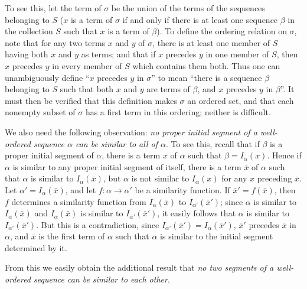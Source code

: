 \documentclass{article}
\begin{document}
To see this, let the term of $\sigma$ be the union of the terms of the sequences belonging to $S$ ($x$ is a term of $\sigma$ if and only if there is at least one sequence $\beta$ in the collection $S$ such that $x$ is a term of $\beta$). To define the ordering relation on $\sigma$, note that for any two terms $x$ and $y$ of $\sigma$, there is at least one member of $S$ having both $x$ and $y$ as terms; and that if $x$ precedes $y$ in one member of $S$, then $x$ precedes $y$ in every member of $S$ which contains them both. Thus one can unambiguously define ``$x$ precedes $y$ in $\sigma$'' to mean ``there is a sequence $\beta$ belonging to $S$ such that both $x$ and $y$ are terms of $\beta$, and $x$ precedes $y$ in $\beta$''. It must then be verified that this definition makes $\sigma$ an ordered set, and that each nonempty subset of $\sigma$ has a first term in this ordering; neither is difficult.

We also need the following observation: \emph{no proper initial segment of a well-ordered sequence $\alpha$ can be similar to all of $\alpha$}. To see this, recall that if $\beta$ is a proper initial segment of $\alpha$, there is a term $x$ of $\alpha$ such that $\beta = I_\alpha(x)$. Hence if $\alpha$ is similar to any proper initial segment of itself, there is a term $\bar{x}$ of $\alpha$ such that $\alpha$ is similar to $I_\alpha(\bar{x})$, but $\alpha$ is not similar to $I_\alpha(x)$ for any $x$ preceding $\bar{x}$. Let $\alpha' = I_\alpha(\bar{x})$, and let $f: \alpha \rightarrow \alpha'$ be a similarity function. If $\bar{x}' = f(\bar{x})$, then $f$ determines a similarity function from $I_\alpha(\bar{x})$ to $I_{\alpha'}(\bar{x}')$; since $\alpha$ is similar to $I_\alpha(\bar{x})$ and $I_\alpha(\bar{x})$ is similar to $I_{\alpha'}(\bar{x}')$, it easily follows that $\alpha$ is similar to $I_{\alpha'}(\bar{x}')$. But this is a contradiction, since $I_{\alpha'}(\bar{x}') = I_{\alpha}(\bar{x}')$, $\bar{x}'$ precedes $\bar{x}$ in $\alpha$, and $\bar{x}$ is the first term of $\alpha$ such that $\alpha$ is similar to the initial segment determined by it.

From this we easily obtain the additional result that \emph{no two segments of a well-ordered sequence can be similar to each other}.
\end{document}
